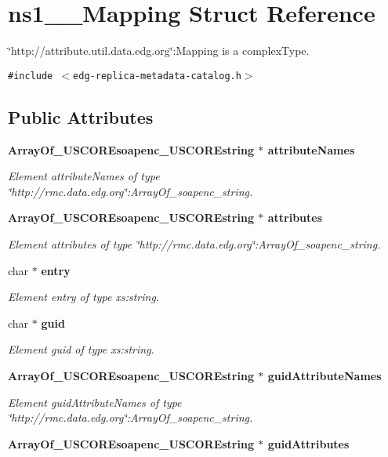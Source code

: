 \section{ns1\_\-\_\-Mapping Struct Reference}
\label{structns1____Mapping}
\char`\"{}http://attribute.util.data.edg.org\char`\"{}:Mapping is a complex\-Type.  


{\tt \#include $<$edg-replica-metadata-catalog.h$>$}

\subsection*{Public Attributes}
\begin{CompactItemize}
\item 
\bf{Array\-Of\_\-USCOREsoapenc\_\-USCOREstring} $\ast$ \bf{attribute\-Names}
\begin{CompactList}\small\item\em Element attribute\-Names of type \char`\"{}http://rmc.data.edg.org\char`\"{}:Array\-Of\_\-soapenc\_\-string. \item\end{CompactList}\item 
\bf{Array\-Of\_\-USCOREsoapenc\_\-USCOREstring} $\ast$ \bf{attributes}
\begin{CompactList}\small\item\em Element attributes of type \char`\"{}http://rmc.data.edg.org\char`\"{}:Array\-Of\_\-soapenc\_\-string. \item\end{CompactList}\item 
char $\ast$ \bf{entry}
\begin{CompactList}\small\item\em Element entry of type xs:string. \item\end{CompactList}\item 
char $\ast$ \bf{guid}
\begin{CompactList}\small\item\em Element guid of type xs:string. \item\end{CompactList}\item 
\bf{Array\-Of\_\-USCOREsoapenc\_\-USCOREstring} $\ast$ \bf{guid\-Attribute\-Names}
\begin{CompactList}\small\item\em Element guid\-Attribute\-Names of type \char`\"{}http://rmc.data.edg.org\char`\"{}:Array\-Of\_\-soapenc\_\-string. \item\end{CompactList}\item 
\bf{Array\-Of\_\-USCOREsoapenc\_\-USCOREstring} $\ast$ \bf{guid\-Attributes}\label{structns1____Mapping_6d621ef8882153203d71881540f88177}


\end{CompactItemize}

